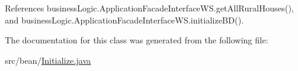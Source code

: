 References business\+Logic.\+Application\+Facade\+Interface\+W\+S.\+get\+All\+Rural\+Houses(), and business\+Logic.\+Application\+Facade\+Interface\+W\+S.\+initialize\+B\+D().



The documentation for this class was generated from the following file\+:\begin{DoxyCompactItemize}
\item 
src/bean/\mbox{\hyperlink{Initialize_8java}{Initialize.\+java}}\end{DoxyCompactItemize}
